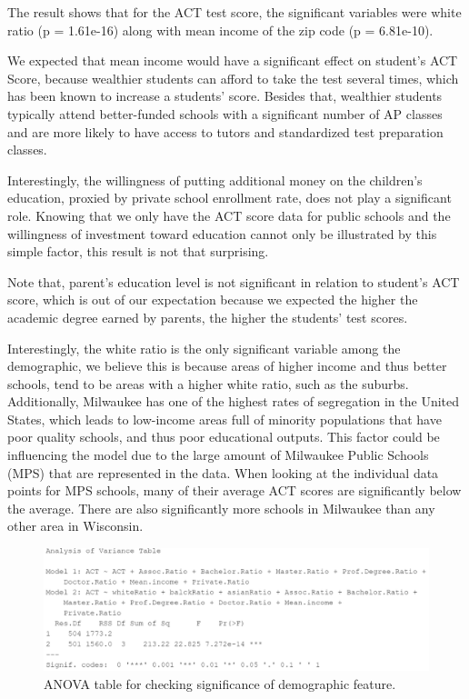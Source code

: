 \documentclass[letterpaper, 10 pt, conference]{ieeeconf}  %
\begin{document}
The result shows that for the ACT test score, the significant variables were white ratio (p = 1.61e-16) along with mean income of the zip code (p = 6.81e-10).

We expected that mean income would have a significant effect on student's ACT Score, because wealthier students can afford to take the test several times, which has been known to increase a students' score. Besides that, wealthier students typically attend better-funded schools with a significant number of AP classes and are more likely to have access to tutors and standardized test preparation classes. 

Interestingly, the willingness of putting additional money on the children's education, proxied by private school enrollment rate, does not play a significant role.
Knowing that we only have the ACT score data for public schools and the willingness of investment toward education cannot only be illustrated by this simple factor, this result is not that surprising.

Note that, parent's education level is not significant in relation to student's ACT score, which is out of our expectation because we expected the higher the academic degree earned by parents, the higher the students' test scores. 

Interestingly, the white ratio is the only significant variable among the demographic, we believe this is because areas of higher income and thus better schools, tend to be areas with a higher white ratio, such as the suburbs. Additionally, Milwaukee has one of the highest rates of segregation in the United States, which leads to low-income areas full of minority populations that have poor quality schools, and thus poor educational outputs.
This factor could be influencing the model due to the large amount of Milwaukee Public Schools (MPS) that are represented in the data. When looking at the individual data points for MPS schools, many of their average ACT scores are significantly below the average. There are also significantly more schools in Milwaukee than any other area in Wisconsin. 

\begin{figure}[h]
\begin{center}
\includegraphics[width=1.0\linewidth]{ANOVA_ACT.PNG}
\end{center}
\caption{ANOVA table for checking significance of demographic feature.}
\label{fig:long}
\label{fig:onecol}
\end{figure}
\end{document}
